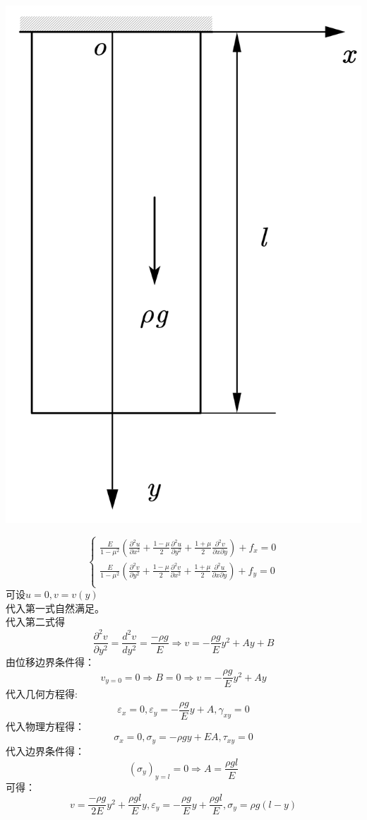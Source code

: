 \centerline{\includegraphics[scale=0.35]{figure/2-9.png}}
	\begin{remark}
		\[	\begin{cases}
		\frac{E}{1-\mu ^2}\left( \frac{\partial ^2u}{\partial x^2}+\frac{1-\mu}{2}\frac{\partial ^2u}{\partial y^2}+\frac{1+\mu}{2}\frac{\partial ^2v}{\partial x\partial y} \right) +f_x=0\\
		\frac{E}{1-\mu ^2}\left( \frac{\partial ^2v}{\partial y^2}+\frac{1-\mu}{2}\frac{\partial ^2v}{\partial x^2}+\frac{1+\mu}{2}\frac{\partial ^2u}{\partial x\partial y} \right) +f_y=0\\
		\end{cases}\]
		可设$u=0,v=v\left( y \right) $\\
		代入第一式自然满足。\\
		代入第二式得\[\frac{\partial ^2v}{\partial y^2}=\frac{d^2v}{dy^2}=\frac{-\rho g}{E}\Longrightarrow v=-\frac{\rho g}{E}y^2+Ay+B\]
		由位移边界条件得：\[v_{y=0}=0\Longrightarrow B=0\Longrightarrow v=-\frac{\rho g}{E}y^2+Ay\]
		代入几何方程得:\[\varepsilon _x=0,\varepsilon _y=-\frac{\rho g}{E}y+A,\gamma _{xy}=0\]
		代入物理方程得：\[\sigma _x=0,\sigma _y=-\rho gy+EA,\tau _{xy}=0\]
		代入边界条件得：\[\left( \sigma _y \right) _{y=l}=0\Longrightarrow A=\frac{\rho gl}{E}\]
		可得：\[v=\frac{-\rho g}{2E}y^2+\frac{\rho gl}{E}y,\varepsilon _y=-\frac{\rho g}{E}y+\frac{\rho gl}{E},\sigma _y=\rho g\left( l-y \right) \]
	\end{remark}
	
